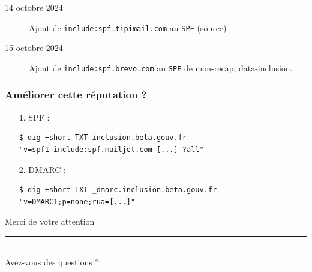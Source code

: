 \documentclass{beamer}
\begin{document}
\begin{frame}[fragile]
\begin{description}
        \item[\footnotesize 14 octobre 2024] \small Ajout de \texttt{include:spf.tipimail.com} au \texttt{SPF} \href{https://www.notion.so/gip-inclusion/Tri-Tech-3-14-10-2024-31e7a9eb90ce4f15b09830bcf1630ab6?pvs=4#11f5f321b6048010ba67f27862cf9d60}{(source)}
        \item[\footnotesize 15 octobre 2024] \small Ajout de \texttt{include:spf.brevo.com} au \texttt{SPF} de mon-recap, data-inclusion.
    \end{description}
\end{frame}

\begin{frame}[fragile]
    \frametitle{Améliorer cette réputation ?}
    \begin{itemize}
        \pause
        \item[1.] SPF :
            \begin{verbatim}
$ dig +short TXT inclusion.beta.gouv.fr
"v=spf1 include:spf.mailjet.com [...] ?all"
            \end{verbatim}
        \pause
        \item[2.] DMARC :
            \begin{verbatim}
$ dig +short TXT _dmarc.inclusion.beta.gouv.fr
"v=DMARC1;p=none;rua=[...]"
            \end{verbatim}
    \end{itemize}
\end{frame}

\begin{frame}[focus]
    Merci de votre attention
    \\
    \vspace{20pt}
    \rule{\textwidth}{1pt}
    \\
    \vspace{30pt}
    Avez-vous des questions ?
\end{frame}
\end{document}
